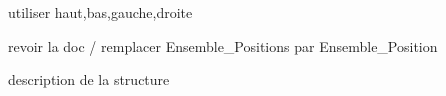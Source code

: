 
\begin{DoxyRefList}
\item[\label{todo__todo000003}%
\hypertarget{todo__todo000003}{}%
\-Membre \hyperlink{libertes_8c_ad3022110d9d089ca0e9672f8aa89bbf1}{determine\-Liberte} (\-Plateau plateau, \-Chaine chaine)]utiliser haut,bas,gauche,droite  
\item[\label{todo__todo000002}%
\hypertarget{todo__todo000002}{}%
\-Fichier \hyperlink{ensemble__positions_8h}{ensemble\-\_\-positions.h} ]revoir la doc / remplacer \-Ensemble\-\_\-\-Positions par \-Ensemble\-\_\-\-Position  
\item[\label{todo__todo000001}%
\hypertarget{todo__todo000001}{}%
\-Membre \hyperlink{matrice_8h_a4692c384a5050f8e48ebbd9e5b2d88ac}{\-Matrice} ]description de la structure 
\end{DoxyRefList}